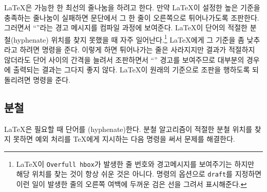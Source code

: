 \LaTeX 은 가능한 한 최선의 줄나눔을 하려고 한다. 만약 \LaTeX 이 설정한 높은 기준을 충족하는
줄나눔이 실패하면 문단에서 그 한 줄이 오른쪽으로 튀어나가도록 조판한다. 그러면서 ``''라는 
경고 메시지를 컴파일 과정에 보여준다. \LaTeX 이 단어의 적절한 분철(hyphenate) 위치를 찾지 못했을 때 자주 일어난다.\footnote{%
  \LaTeX 이 \texttt{Overfull \bs{}hbox}가 발생한 줄 번호와 경고메시지를 보여주기는 하지만
  해당 위치를 찾는 것이 항상 쉬운 것은 아니다.  명령의 옵션으로 \texttt{draft}를
  지정하면 이런 일이 발생한 줄의 오른쪽 여백에 두꺼운 검은 선을 그려서 표시해준다.
}
\LaTeX 에게 그 기준을 좀 낮추라고 하려면  명령을 준다. 이렇게 하면
튀어나가는 줄은 사라지지만 결과가 적절하지 않더라도 단어 사이의 간격을 늘려서 조판하면서 ``''
경고를 보여주므로 대부분의 경우에 출력되는 결과는 그다지 좋지 않다. 
\LaTeX 이 원래의 기준으로 조판을 행하도록 되돌리려면  명령을 준다.


\subsection{분철} \label{hyph}

\LaTeX 은 필요할 때 단어를 (hyphenate)한다.
분철 알고리즘이 적절한 분철 위치를 찾지 못하면
예외 처리를 \TeX{}에게 지시하는 다음 명령을 써서 문제를 해결한다.

